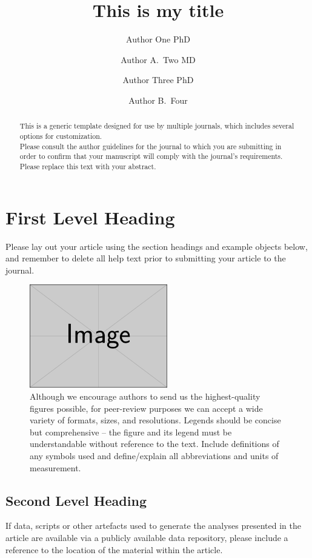 \documentclass[num-refs]{wiley-article}
\title{This is my title}
\author[1\authfn{1}]{Author One PhD}
\author[2\authfn{1}]{Author A.~Two MD}
\author[2\authfn{2}]{Author Three PhD}
\author[2]{Author B.~Four}
\affil[1]{Department, Institution, City, State or Province, Postal Code, Country}
\affil[2]{Department, Institution, City, State or Province, Postal Code, Country}
\begin{document}
\begin{frontmatter}
\maketitle

\begin{abstract}
This is a generic template designed for use by multiple journals, which includes several options for customization. \\
Please consult the author guidelines for the journal to which you are submitting in order to confirm that your manuscript will comply with the journal's requirements.\\
Please replace this text with your abstract.

\end{abstract}
\end{frontmatter}

\section{First Level Heading}
Please lay out your article using the section headings and example objects below, and remember to delete all help text prior to submitting your article to the journal.

\begin{figure}[bt]
\centering
\includegraphics[width=6cm]{example-image-rectangle}
\caption{Although we encourage authors to send us the highest-quality figures possible, for peer-review purposes we can accept a wide variety of formats, sizes, and resolutions. Legends should be concise but comprehensive -- the figure and its legend must be understandable without reference to the text. Include definitions of any symbols used and define/explain all abbreviations and units of measurement.}
\end{figure}

\subsection{Second Level Heading}
If data, scripts or other artefacts used to generate the analyses presented in the article are available via a publicly available data repository, please include a reference to the location of the material within the article.
\end{document}

